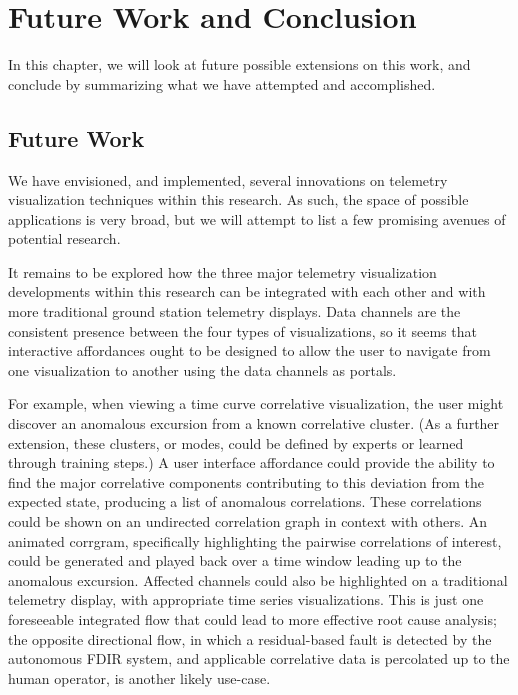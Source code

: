 \chapter{Future Work and Conclusion}

In this chapter, we will look at future possible extensions on this work, and conclude by summarizing what we have attempted and accomplished.

\section{Future Work}

We have envisioned, and implemented, several innovations on telemetry visualization techniques within this research. As such, the space of possible applications is very broad, but we will attempt to list a few promising avenues of potential research.

It remains to be explored how the three major telemetry visualization developments within this research can be integrated with each other and with more traditional ground station telemetry displays. Data channels are the consistent presence between the four types of visualizations, so it seems that interactive affordances ought to be designed to allow the user to navigate from one visualization to another using the data channels as portals.

For example, when viewing a time curve correlative visualization, the user might discover an anomalous excursion from a known correlative cluster. (As a further extension, these clusters, or modes, could be defined by experts or learned through training steps.) A user interface affordance could provide the ability to find the major correlative components contributing to this deviation from the expected state, producing a list of anomalous correlations. These correlations could be shown on an undirected correlation graph in context with others. An animated corrgram, specifically highlighting the pairwise correlations of interest, could be generated and played back over a time window leading up to the anomalous excursion. Affected channels could also be highlighted on a traditional telemetry display, with appropriate time series visualizations. This is just one foreseeable integrated flow that could lead to more effective root cause analysis; the opposite directional flow, in which a residual-based fault is detected by the autonomous FDIR system, and applicable correlative data is percolated up to the human operator, is another likely use-case.


